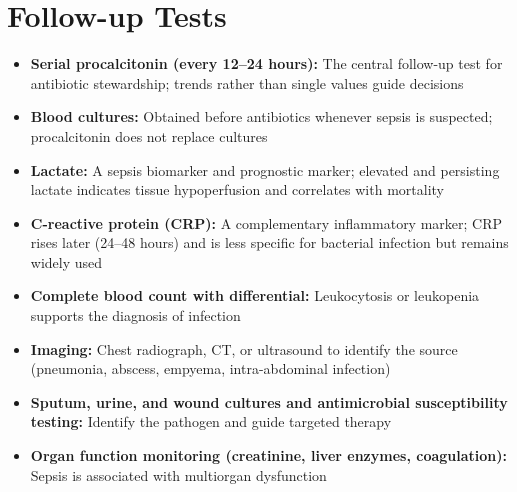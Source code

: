 \section*{Follow-up Tests}
\begin{itemize}
  \item \textbf{Serial procalcitonin (every 12--24 hours):} The central follow-up test for antibiotic stewardship; trends rather than single values guide decisions
  \item \textbf{Blood cultures:} Obtained before antibiotics whenever sepsis is suspected; procalcitonin does not replace cultures
  \item \textbf{Lactate:} A sepsis biomarker and prognostic marker; elevated and persisting lactate indicates tissue hypoperfusion and correlates with mortality
  \item \textbf{C-reactive protein (CRP):} A complementary inflammatory marker; CRP rises later (24--48 hours) and is less specific for bacterial infection but remains widely used
  \item \textbf{Complete blood count with differential:} Leukocytosis or leukopenia supports the diagnosis of infection
  \item \textbf{Imaging:} Chest radiograph, CT, or ultrasound to identify the source (pneumonia, abscess, empyema, intra-abdominal infection)
  \item \textbf{Sputum, urine, and wound cultures and antimicrobial susceptibility testing:} Identify the pathogen and guide targeted therapy
  \item \textbf{Organ function monitoring (creatinine, liver enzymes, coagulation):} Sepsis is associated with multiorgan dysfunction
\end{itemize}

